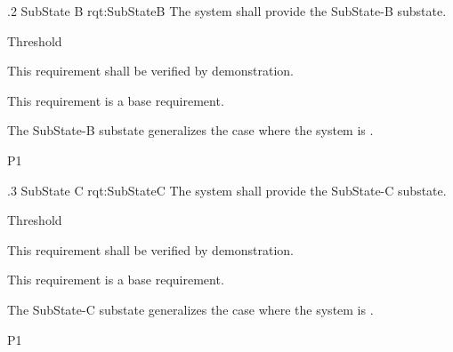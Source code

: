 \ONERQMTV
{\RqtNumberBase.2}
{SubState B}
{rqt:SubStateB}
{The system shall provide the SubState-B substate.}
{
	\item [Phase 1] Threshold
}
{This requirement shall be verified by demonstration.}
{
	\item [N/A] This requirement is a base requirement.
}
{
	\item The SubState-B substate generalizes the case where the system is \TBD.
}
{P1}


\ONERQMTV
{\RqtNumberBase.3}
{SubState C}
{rqt:SubStateC}
{The system shall provide the SubState-C substate.}
{
	\item [Phase 1] Threshold
}
{This requirement shall be verified by demonstration.}
{
	\item [N/A] This requirement is a base requirement.
}
{
	\item The SubState-C substate generalizes the case where the system is \TBD.
}
{P1}
